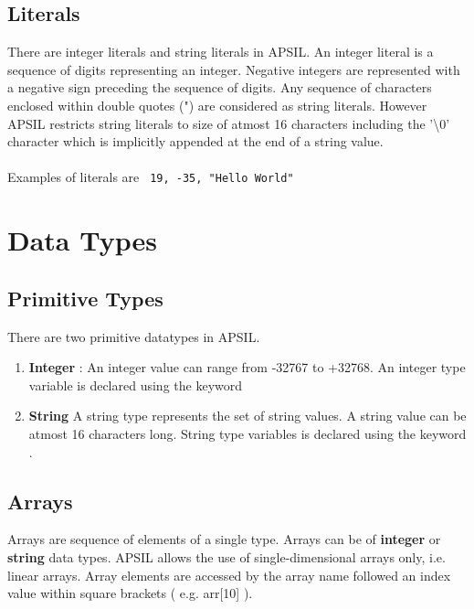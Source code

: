 \documentclass[11pt]{article}
\begin{document}
\subsection{Literals}
There are integer literals and string literals in APSIL. An integer literal is a sequence of digits representing an integer.
Negative integers are represented with a negative sign preceding the sequence of digits. Any sequence of characters enclosed within double quotes (") are considered as string literals. However APSIL restricts string literals to size of atmost 16 characters including the '\textbackslash 0' character which is implicitly appended at the end of a string value. 
\\
\\
Examples of literals are \texttt{
 19, -35, "Hello World"}


\section{Data Types}

\subsection{Primitive Types}
There are two primitive datatypes in APSIL. 
\begin{enumerate}

\item \textbf{Integer} : An integer value can range from -32767 to +32768. An integer type variable is declared using the keyword 
\item \textbf{String}  
A string type represents the set of string values. A string value can be atmost 16 characters long. String type variables is declared using the keyword .
\end{enumerate}


\subsection{Arrays}
Arrays are  sequence of elements of a single type. Arrays can be of \textbf{integer} or \textbf{string} data types.
APSIL allows the use of single-dimensional arrays only, i.e. linear arrays. Array elements are accessed by the array name followed an index value within square brackets ( e.g. arr[10] ).


\end{document}

